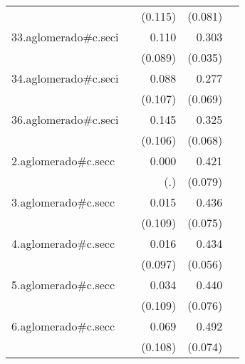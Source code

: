 {\begin{longtable}{l*{4}{D{.}{.}{-1}}}
            &                     &     (0.115)         &     (0.081)         &                     \\
\addlinespace
33.aglomerado#c.seci&                     &       0.110         &       0.303\sym{***}&                     \\
            &                     &     (0.089)         &     (0.035)         &                     \\
\addlinespace
34.aglomerado#c.seci&                     &       0.088         &       0.277\sym{***}&                     \\
            &                     &     (0.107)         &     (0.069)         &                     \\
\addlinespace
36.aglomerado#c.seci&                     &       0.145         &       0.325\sym{***}&                     \\
            &                     &     (0.106)         &     (0.068)         &                     \\
\addlinespace
2.aglomerado#c.secc&                     &       0.000         &       0.421\sym{***}&                     \\
            &                     &         (.)         &     (0.079)         &                     \\
\addlinespace
3.aglomerado#c.secc&                     &       0.015         &       0.436\sym{***}&                     \\
            &                     &     (0.109)         &     (0.075)         &                     \\
\addlinespace
4.aglomerado#c.secc&                     &       0.016         &       0.434\sym{***}&                     \\
            &                     &     (0.097)         &     (0.056)         &                     \\
\addlinespace
5.aglomerado#c.secc&                     &       0.034         &       0.440\sym{***}&                     \\
            &                     &     (0.109)         &     (0.076)         &                     \\
\addlinespace
6.aglomerado#c.secc&                     &       0.069         &       0.492\sym{***}&                     \\
            &                     &     (0.108)         &     (0.074)         &                     \\

\end{longtable}}
